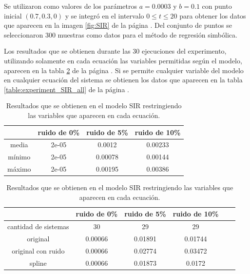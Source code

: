 Se utilizaron como valores de los parámetros $a = 0.0003$ y $b = 0.1$ con punto inicial $(0.7, 0.3, 0)$ y se integró en el intervalo $0 \leq t \leq 20$ para obtener los datos que aparecen en la imagen \ref{fig:SIR} de la página \pageref{fig:SIR}. Del conjunto de puntos se seleccionaron 300 muestras como datos para el método de regresión simbólica.

Los resultados que se obtienen durante las 30 ejecuciones del experimento, utilizando solamente en cada ecuación las variables permitidas según el modelo, aparecen en la tabla \ref{table:experiment_SIR} de la página \pageref{table:experiment_SIR}. Si se permite cualquier variable del modelo en cualquier ecuación del sistema se obtienen los datos que aparecen en la tabla \ref{table:experiment_SIR_all} de la página \pageref{table:experiment_SIR_all}.

\begin{table}[!h]
    \centering
    \caption{Resultados que se obtienen en el modelo SIR restringiendo las variables que aparecen en cada ecuación.}
    \begin{tabular}{|c|c|c|c|}
        \hline
               & \textbf{ruido de 0\%} & \textbf{ruido de 5\%} & \textbf{ruido de 10\%} \\
        \hline
        media  & 2e-05                 & 0.0012                & 0.00233                \\
        \hline
        mínimo & 2e-05                 & 0.00078               & 0.00144                \\
        \hline
        máximo & 2e-05                 & 0.00195               & 0.00386                \\
        \hline
    \end{tabular}

    \begin{tabular}{|c|c|c|c|c|c|}
        \hline
                             & \textbf{ruido de 0\%} & \textbf{ruido de 5\%} & \textbf{ruido de 10\%} \\
        \hline
        cantidad de sistemas & 30                    & 29                    & 29                     \\
        \hline
        original             & 0.00066               & 0.01891               & 0.01744                \\
        \hline
        original con ruido   & 0.00066               & 0.02774               & 0.03472                \\
        \hline
        spline               & 0.00066               & 0.01873               & 0.0172                 \\
        \hline
    \end{tabular}
    \label{table:experiment_SIR}
\end{table}

